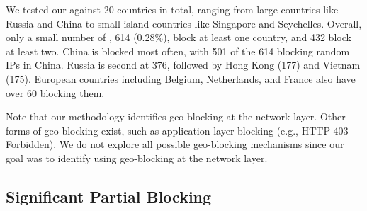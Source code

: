 We tested our {} against 20 countries in total, ranging
from large countries like Russia and China to small island countries
like Singapore and Seychelles.  Overall, only a small number of
{}, 614 (0.28\%), block at least one country, and 432 block
at least two.  China is blocked most often, with 501 of the 614
{} blocking random IPs in China.  Russia is second at 376,
followed by Hong Kong (177) and Vietnam (175).  European countries
including Belgium, Netherlands, and France also have over 60
{} blocking them.

Note that our methodology identifies geo-blocking at the network
layer.  Other forms of geo-blocking exist, such as application-layer
blocking (e.g., HTTP 403 Forbidden).  We do not explore all possible
geo-blocking mechanisms since our goal was to identify {}
using geo-blocking at the network layer.



\subsection{Significant Partial Blocking}


